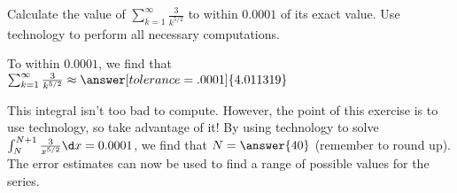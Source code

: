 \documentclass{ximera}
\author{Jim Talamo}
\begin{document}
\begin{exercise}

Calculate the value of $\sum_{k=1}^{\infty} \frac{3}{k^{5/2}}$ to within $0.0001$ of its exact value.  Use technology to perform all necessary computations.


To within $0.0001$, we find that $\sum_{k=1}^{\infty}  \frac{3}{k^{5/2}} \approx \answer[tolerance=.0001]{4.011319}$
\begin{hint}
This integral isn't too bad to compute.  However, the point of this exercise is to use technology, so take advantage of it!  By using technology to solve $\int_N^{N+1} \frac{3}{x^{5/2}} \d x =0.0001$, we find that $N = \answer{40}$ (remember to round up).  The error estimates can now be used to find a range of possible values for the series.
\end{hint}

\end{exercise}
\end{document}
